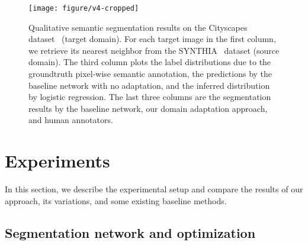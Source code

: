 

\iffalse
\begin{figure*}
\small
\centering
    \texttt{[image: figure/v4-cropped]}
    \vspace{-10pt}
  \caption{Qualitative semantic segmentation results on the Cityscapes dataset~\cite{ros_synthia_2016} (target domain). For each target image in the first column, we retrieve its nearest neighbor from the SYNTHIA~\cite{cordts_cityscapes_2016} dataset (source domain). The third column plots the label distributions due to the groundtruth pixel-wise semantic annotation, the predictions by the baseline network with no adaptation, and the inferred distribution by logistic regression. The last three columns are the segmentation results by the baseline network, our domain adaptation approach, and human annotators.} \label{fQualitative}
\end{figure*}
\fi

\begin{sidewaysfigure*}
\small
\centering
    \texttt{[image: figure/v4-cropped]}
    \vspace{-20pt}
  \caption{Qualitative semantic segmentation results on the Cityscapes dataset~\cite{ros_synthia_2016} (target domain). For each target image in the first column, we retrieve its nearest neighbor from the SYNTHIA~\cite{cordts_cityscapes_2016} dataset (source domain). The third column plots the label distributions due to the groundtruth pixel-wise semantic annotation, the predictions by the baseline network with no adaptation, and the inferred distribution by logistic regression. The last three columns are the segmentation results by the baseline network, our domain adaptation approach, and human annotators.} \label{fQualitative}
  \vspace{-15pt}
\end{sidewaysfigure*}

\section{Experiments} \label{sExperiments}

In this section, we describe the experimental setup and compare the results of our approach, its variations, and some existing baseline methods.

\subsection{Segmentation network and optimization}

